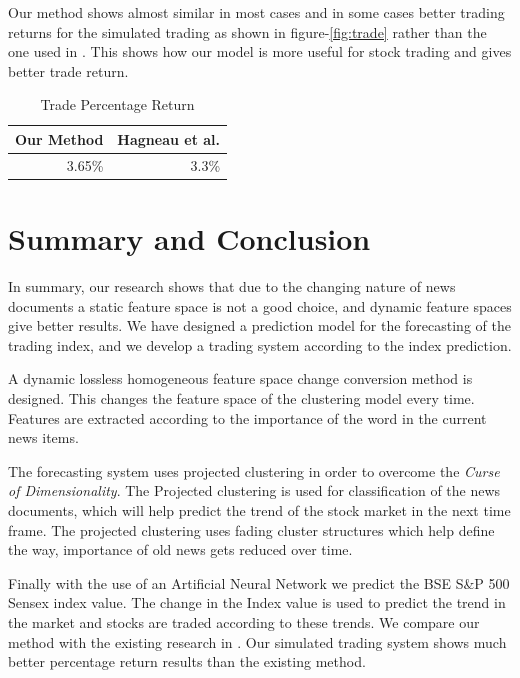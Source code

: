 \documentclass[a4paper,12bp]{report}
\begin{document}
Our method shows almost similar in most cases and in some cases better trading returns for the simulated trading as shown in figure-\ref{fig:trade} rather than the one used in \cite{Hagenau:2013}. This shows how our model is more useful for stock trading and gives better trade return. 

\begin{table}[htbp]
\centering
\caption{Trade Percentage Return}
\label{tab:return}
\vspace{15pt}
\begin{tabular}{|c|c|}
\hline
Our Method                   & Hagneau et al. \cite{Hagenau:2013}              \\ \hline
\multicolumn{1}{|r|}{3.65\%} & \multicolumn{1}{r|}{3.3\%} \\ \hline
\end{tabular}
\end{table}

\chapter{Summary and Conclusion}
In summary, our research shows that due to the changing nature of news documents a static feature space is not a good choice, and dynamic feature spaces give better results. We have designed a prediction model for the forecasting of the trading index, and we develop a trading system according to the index prediction. 

A dynamic lossless homogeneous feature space change conversion method is designed. This changes the feature space of the clustering model every time. Features are extracted according to the importance of the word in the current news items. 

The forecasting system uses projected clustering in order to overcome the \textit{Curse of Dimensionality}. The Projected clustering is used for classification of the news documents, which will help predict the trend of the stock market in the next time frame. The projected clustering uses fading cluster structures which help define the way, importance of old news gets reduced over time.

Finally with the use of an Artificial Neural Network we predict the BSE S\&P 500 Sensex index value. The change in the Index value is used to predict the trend in the market and stocks are traded according to these trends. We compare our method with the existing research in \cite{Hagenau:2013}. Our simulated trading system shows much better percentage return results than the existing method.
\end{document}
